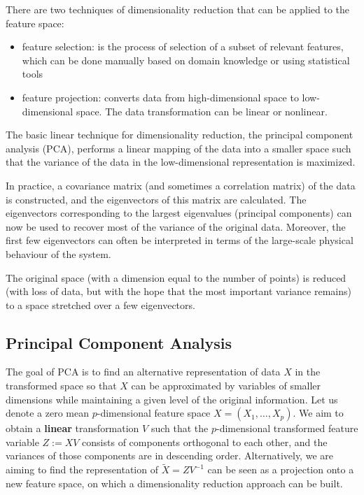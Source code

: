 There are two techniques of dimensionality reduction that can be applied to the feature
space:
\begin{itemize}
\item feature selection: is the process of selection of a subset of relevant features, which can be done manually based on domain knowledge or using statistical tools
\item feature projection: converts data from high-dimensional space to low-dimensional space. The data transformation can be linear or nonlinear.
\end{itemize}

The basic linear technique for dimensionality reduction, the principal component analysis (PCA), performs a linear mapping of the data into a smaller space such that the variance of the data in the low-dimensional representation is maximized. 

In practice, a covariance matrix (and sometimes a correlation matrix) of the data is constructed, and the eigenvectors of this matrix are calculated. The eigenvectors corresponding to the largest eigenvalues (principal components) can now be used to recover most of the variance of the original data. Moreover, the first few eigenvectors can often be interpreted in terms of the large-scale physical behaviour of the system. 

The original space (with a dimension equal to the number of points) is reduced (with loss of data, but with the hope that the most important variance remains) to a space stretched over a few eigenvectors.

\subsection{Principal Component Analysis}
The goal of PCA is to find an alternative representation of data $X$ in the transformed space so that $X$ can be approximated by variables of smaller dimensions while maintaining a given level of the original information.
Let us denote a zero mean $p$-dimensional feature space $X = (X_1, \ldots, X_p)$. We aim to obtain a \textbf{linear} transformation $V$ such that the $p$-dimensional transformed feature variable $Z := XV$ consists of components orthogonal to each other, and the variances of those components are in descending order. Alternatively, we are aiming to find the representation of $\tilde{X} = ZV^{-1}$ can be seen as a projection onto a new feature space, on which a dimensionality reduction approach can be built.

